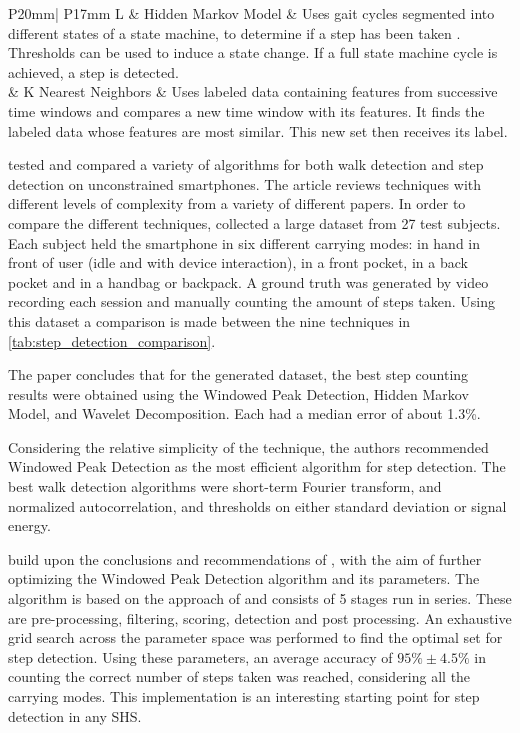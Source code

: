 \begin{table}[]
\begin{tabularx}{\linewidth}{ P{20mm}| P{17mm} L}
		 & Hidden Markov Model & Uses gait cycles segmented into different states of a state machine, to determine if a step has been taken \cite{Ren2016a}. Thresholds can be used to induce a state change. If a full state machine cycle is achieved, a step is detected.\\ 
		& K Nearest Neighbors & Uses labeled data containing features from successive time windows and compares a new time window with its features. It finds the labeled data whose features are most similar. This new set then receives its label. \\
		\bottomrule
	\end{tabularx}
	\caption{Overview of different step detection methods using inertial sensors.}
	\label{tab:step_detection_comparison}
\end{table}

\citet{Brajdic2013} tested and compared a variety of algorithms for both walk detection and step detection on unconstrained smartphones. The article reviews techniques with different levels of complexity from a variety of different papers. In order to compare the different techniques, \cite{Brajdic2013} collected a large dataset from 27 test subjects. Each subject held the smartphone in six different carrying modes: in hand in front of user (idle and with device interaction), in a front pocket, in a back pocket and in a handbag or backpack. A ground truth was generated by video recording each session and manually counting the amount of steps taken. Using this dataset a comparison is made between the nine techniques in \cref{tab:step_detection_comparison}.\par 
The paper concludes that for the generated dataset, the best step counting results were obtained using the Windowed Peak Detection, Hidden Markov Model, and Wavelet Decomposition. Each had a median error of about 1.3\%.\par 
Considering the relative simplicity of the technique, the authors recommended Windowed Peak Detection as the most efficient algorithm for step detection. The best walk detection algorithms were short-term Fourier transform, and normalized autocorrelation, and thresholds on either standard deviation or signal energy.\par
\citet{Salvi2018} build upon the conclusions and recommendations of \citet{Brajdic2013}, with the aim of further optimizing the Windowed Peak Detection algorithm and its parameters. The algorithm is based on the approach of \citet{Palshikar2009} and consists of 5 stages run in series. These are pre-processing, filtering, scoring, detection and post processing. An exhaustive grid search across the parameter space was performed to find the optimal set for step detection. Using these parameters, an average accuracy of $95\% \pm 4.5\%$ in counting the correct number of steps taken was reached, considering all the carrying modes. This implementation is an interesting starting point for step detection in any \ac{SHS}. 

